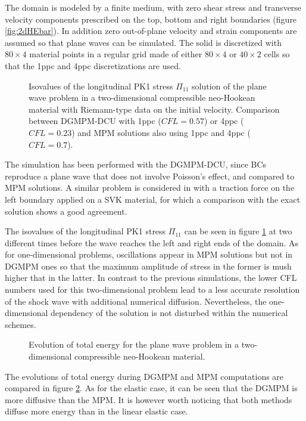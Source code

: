The domain is modeled by a finite medium, with zero shear stress and transverse velocity components prescribed on the top, bottom and right boundaries (figure \ref{fig:2dHEbar}).
In addition zero out-of-plane velocity and strain components are assumed so that plane waves can be simulated.
The solid is discretized with $80\times 4$ material points in a regular grid made of either $80\times 4$ or $40\times 2$ cells so that the 1ppc and 4ppc discretizations are used.
\begin{figure}[h!]
  \centering
  
  \caption{Isovalues of the longitudinal PK1 stress $\Pi_{11}$ solution of the plane wave problem in a two-dimensional compressible neo-Hookean material with Riemann-type data on the initial velocity. Comparison between DGMPM-DCU with 1ppc ($CFL=0.57$) or 4ppc ($CFL=0.23$) and MPM solutions also using 1ppc and 4ppc ($CFL=0.7$).}
  \label{fig:2dplane_Wave}
\end{figure}
The simulation has been performed with the DGMPM-DCU, since BCs reproduce a plane wave that does not involve Poisson's effect, and compared to MPM solutions. A similar problem is considered in \cite{DGMPM} with a traction force on the left boundary applied on a SVK material, for which a comparison with the exact solution shows a good agreement.

The isovalues of the longitudinal PK1 stress $\Pi_{11}$ can be seen in figure \ref{fig:2dplane_Wave} at two different times before the wave reaches the left and right ends of the domain.
As for one-dimensional problems, oscillations appear in MPM solutions but not in DGMPM ones so that the maximum amplitude of stress in the former is mush higher that in the latter.
In contrast to the previous simulations, the lower CFL numbers used for this two-dimensional problem lead to a less accurate resolution of the shock wave with additional numerical diffusion.
Nevertheless, the one-dimensional dependency of the solution is not disturbed within the numerical schemes.
\begin{figure}[h!]
  \centering
  
  \caption{Evolution of total energy for the plane wave problem in a two-dimensional compressible neo-Hookean material.}
  \label{fig:pw_energy}
\end{figure}

The evolutions of total energy during DGMPM and MPM computations are compared in figure \ref{fig:pw_energy}.
As for the elastic case, it can be seen that the DGMPM is more diffusive than the MPM. It is however worth noticing that both methods diffuse more energy than in the linear elastic case. 

